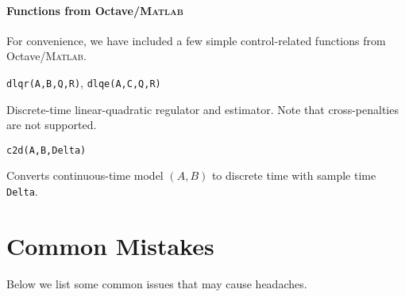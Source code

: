\documentclass{article}
\newcommand{\funcname}[1]{\vspace{.25em}\noindent\texttt{#1}\vspace{.25em}}
\begin{document}
\begin{multicols}{2}
\paragraph*{Functions from Octave/\textsc{Matlab}}

For convenience, we have included a few simple control-related functions from Octave/\textsc{Matlab}.

\funcname{dlqr(A,B,Q,R)}, \funcname{dlqe(A,C,Q,R)}

Discrete-time linear-quadratic regulator and estimator.
Note that cross-penalties are not supported.

\funcname{c2d(A,B,Delta)}

Converts continuous-time model $(A,B)$ to discrete time with sample time \texttt{Delta}.

\end{multicols}

\section{Common Mistakes}

Below we list some common issues that may cause headaches.
\end{document}
